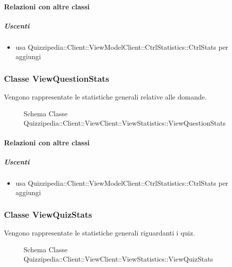 \paragraph{Relazioni con altre classi}
\subparagraph{Uscenti}
\begin{itemize}
\item usa Quizzipedia::Client::ViewModelClient::CtrlStatistics::CtrlStats per aggiungi
\end{itemize}
\subsubsection{Classe ViewQuestionStats}
Vengono rappresentate le statistiche generali relative alle domande.
\begin{figure}[H]
\centering
\noindent{}
\caption[Schema Classe ViewQuestionStats]{Schema Classe Quizzipedia::Client::ViewClient::ViewStatistics::ViewQuestionStats}
\end{figure}
\paragraph{Relazioni con altre classi}
\subparagraph{Uscenti}
\begin{itemize}
\item usa Quizzipedia::Client::ViewModelClient::CtrlStatistics::CtrlStats per aggiungi
\end{itemize}
\subsubsection{Classe ViewQuizStats}
Vengono rappresentate le statistiche generali riguardanti i quiz.
\begin{figure}[H]
\centering
\noindent{}
\caption[Schema Classe ViewQuizStats]{Schema Classe Quizzipedia::Client::ViewClient::ViewStatistics::ViewQuizStats}
\end{figure}
